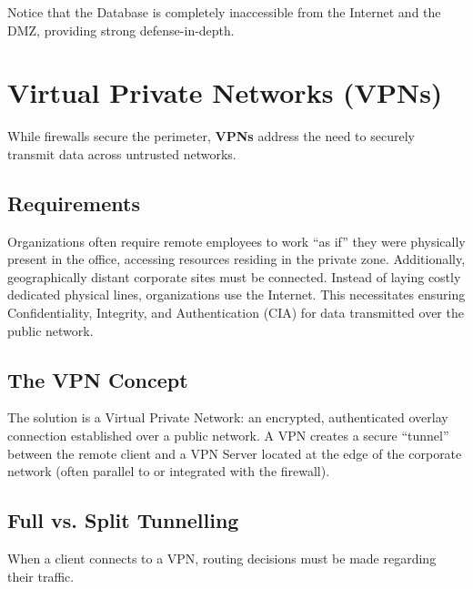 Notice that the Database is completely inaccessible from the Internet and the DMZ, providing strong defense-in-depth.

\section{Virtual Private Networks (VPNs)}

While firewalls secure the perimeter, \textbf{VPNs} address the need to securely transmit data across untrusted networks.

\subsection{Requirements}
Organizations often require remote employees to work ``as if'' they were physically present in the office, accessing resources residing in the private zone. Additionally, geographically distant corporate sites must be connected. Instead of laying costly dedicated physical lines, organizations use the Internet. This necessitates ensuring Confidentiality, Integrity, and Authentication (CIA) for data transmitted over the public network.

\subsection{The VPN Concept}
The solution is a Virtual Private Network: an encrypted, authenticated overlay connection established over a public network. A VPN creates a secure ``tunnel'' between the remote client and a VPN Server located at the edge of the corporate network (often parallel to or integrated with the firewall).

\subsection{Full vs. Split Tunnelling}

When a client connects to a VPN, routing decisions must be made regarding their traffic.

